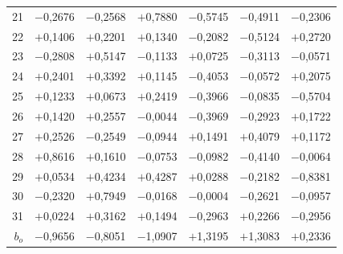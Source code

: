 \begin{tabular}{rrrrrrr}
21 & $-$0,2676 & $-$0,2568 & $+$0,7880 & $-$0,5745 & $-$0,4911 & $-$0,2306 \\
22 & $+$0,1406 & $+$0,2201 & $+$0,1340 & $-$0,2082 & $-$0,5124 & $+$0,2720 \\
23 & $-$0,2808 & $+$0,5147 & $-$0,1133 & $+$0,0725 & $-$0,3113 & $-$0,0571 \\
24 & $+$0,2401 & $+$0,3392 & $+$0,1145 & $-$0,4053 & $-$0,0572 & $+$0,2075 \\
25 & $+$0,1233 & $+$0,0673 & $+$0,2419 & $-$0,3966 & $-$0,0835 & $-$0,5704 \\
26 & $+$0,1420 & $+$0,2557 & $-$0,0044 & $-$0,3969 & $-$0,2923 & $+$0,1722 \\
27 & $+$0,2526 & $-$0,2549 & $-$0,0944 & $+$0,1491 & $+$0,4079 & $+$0,1172 \\
28 & $+$0,8616 & $+$0,1610 & $-$0,0753 & $-$0,0982 & $-$0,4140 & $-$0,0064 \\
29 & $+$0,0534 & $+$0,4234 & $+$0,4287 & $+$0,0288 & $-$0,2182 & $-$0,8381 \\
30 & $-$0,2320 & $+$0,7949 & $-$0,0168 & $-$0,0004 & $-$0,2621 & $-$0,0957 \\
31 & $+$0,0224 & $+$0,3162 & $+$0,1494 & $-$0,2963 & $+$0,2266 & $-$0,2956 \\
\midrule
$b_o$ & $-$0,9656 & $-$0,8051 & $-$1,0907 & $+$1,3195 & $+$1,3083 & $+$0,2336 \\
\bottomrule
\end{tabular}
